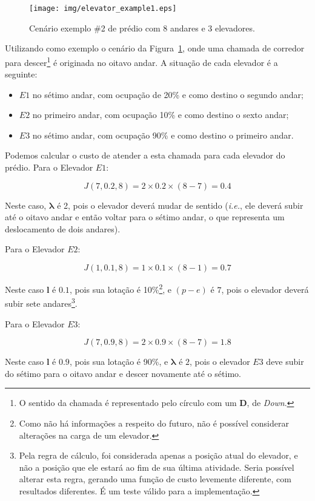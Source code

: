 \begin{figure}[htb!]
  \centering
  \texttt{[image: img/elevator\_example1.eps]}
  \caption{Cenário exemplo \#2 de prédio com 8 andares e 3 elevadores.}
  \label{fig:elevadores-1}
\end{figure}

Utilizando como exemplo o cenário da Figura~\ref{fig:elevadores-1}, onde uma
chamada de corredor para descer\footnote{O sentido da chamada é representado
pelo círculo com um \textbf{D}, de \textit{Down}.} é originada no oitavo andar.
A situação de cada elevador é a seguinte:

\begin{itemize}
\item $E1$ no sétimo andar, com ocupação de 20\% e como destino o segundo andar;
\item $E2$ no primeiro andar, com ocupação 10\% e como destino o sexto andar;
\item $E3$ no sétimo andar, com ocupação 90\% e como destino o primeiro andar.
\end{itemize}

Podemos calcular o custo de atender a esta chamada para cada elevador do prédio.
Para o Elevador $E1$:

\[J(7, 0.2, 8) = 2 \times 0.2 \times (8 - 7) = 0.4\]

Neste caso, $\boldsymbol{\lambda}$ é 2, pois o elevador deverá mudar de sentido
(\textit{i.e.}, ele deverá subir até o oitavo andar e então voltar para o sétimo
andar, o que representa um deslocamento de dois andares).

Para o Elevador $E2$:

\[J(1, 0.1, 8) = 1 \times 0.1 \times (8 - 1) = 0.7\]

Neste caso $\boldsymbol{l}$ é $0.1$, pois sua lotação é 10\%\footnote{Como não
há informações a respeito do futuro, não é possível considerar alterações na
carga de um elevador.}, e $(p - e)$ é $7$, pois o elevador deverá subir sete
andares\footnote{Pela regra de cálculo, foi considerada apenas a posição atual
do elevador, e não a posição que ele estará ao fim de sua última atividade.
Seria possível alterar esta regra, gerando uma função de custo levemente
diferente, com resultados diferentes. É um teste válido para a implementação.}.

Para o Elevador $E3$:

\[J(7, 0.9, 8) = 2 \times 0.9\times (8 - 7) = 1.8\]

Neste caso $\boldsymbol{l}$ é $0.9$, pois sua lotação é 90\%, e
$\boldsymbol{\lambda}$ é $2$, pois o elevador $E3$ deve subir do sétimo para o
oitavo andar e descer novamente até o sétimo.

